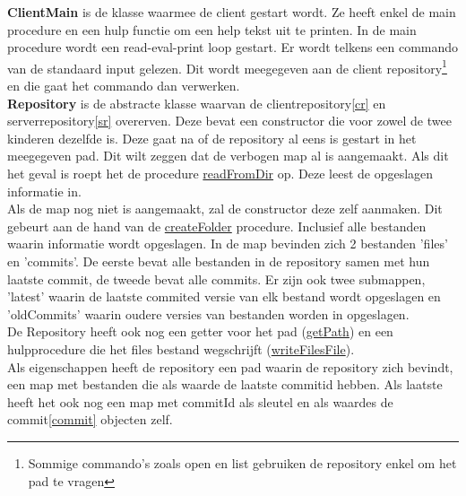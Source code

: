 \documentclass{article}
\begin{document}
\textbf{ClientMain} is de klasse waarmee de client gestart wordt. Ze heeft enkel de main procedure en een hulp functie om een help tekst uit te printen. In de main procedure wordt een read-eval-print loop gestart. Er wordt telkens een commando van de standaard input gelezen. Dit wordt meegegeven aan de client repository\footnote{Sommige commando's zoals open en list gebruiken de repository enkel om het pad te vragen} en die gaat het commando dan verwerken.\\

\textbf{Repository} is de abstracte klasse waarvan de clientrepository\ref{cr} en serverrepository\ref{sr} overerven. Deze bevat een constructor die voor zowel de twee kinderen dezelfde is. Deze gaat na of de repository al eens is gestart in het meegegeven pad. Dit wilt zeggen dat de verbogen map al is aangemaakt. Als dit het geval is roept het de procedure \underline{readFromDir} op. Deze leest de opgeslagen informatie in.\\
Als de map nog niet is aangemaakt, zal de constructor deze zelf aanmaken. Dit gebeurt aan de hand van de \underline{createFolder} procedure. Inclusief alle bestanden waarin informatie wordt opgeslagen. In de map bevinden zich 2 bestanden 'files' en 'commits'. De eerste bevat alle bestanden in de repository samen met hun laatste commit, de tweede bevat alle commits. Er zijn ook twee submappen, 'latest' waarin de laatste commited versie van elk bestand wordt opgeslagen en 'oldCommits' waarin oudere versies van bestanden worden in opgeslagen.\\
De Repository heeft ook nog een getter voor het pad (\underline{getPath}) en een hulpprocedure die het files bestand wegschrijft (\underline{writeFilesFile}).\\
Als eigenschappen heeft de repository een pad waarin de repository zich bevindt, een map met bestanden die als waarde de laatste commitid hebben. Als laatste heeft het ook nog een map met commitId als sleutel en als waardes de commit\ref{commit} objecten zelf.\\
\end{document}
